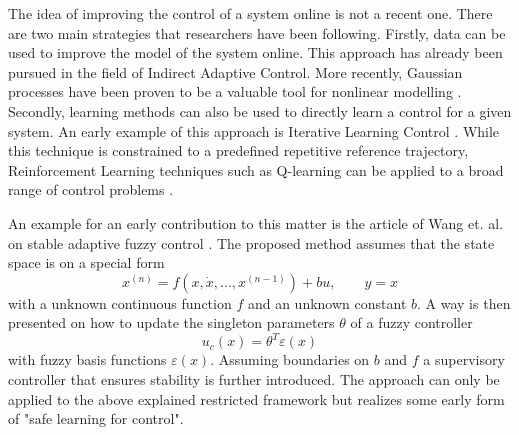 \documentclass[../main.tex]{subfiles}
\begin{document}
The idea of improving the control of a system online is not a recent one. There are two main strategies that researchers have been following. Firstly, data can be used to improve the model of the system online. This approach has already been pursued in the field of Indirect Adaptive Control. More recently, Gaussian processes have been proven to be a valuable tool for nonlinear modelling \cite{murphy2012machine}. Secondly, learning methods can also be used to directly learn a control for a given system. An early example of this approach is Iterative Learning Control \cite{aastrom2013adaptive}. While this technique is constrained to a predefined repetitive reference trajectory, Reinforcement Learning techniques such as Q-learning can be applied to a broad range of control problems \cite{sutton1998reinforcement}.

An example for an early contribution to this matter is the article of Wang et. al. on stable adaptive fuzzy control \cite{wang1993stable}. The proposed method assumes that the state space is on a special form
\begin{equation}
    x^{(n)} = f(x, \dot{x}, ..., x^{(n-1)})+bu, \qquad y=x
\end{equation}
with a unknown continuous function $f$ and an unknown constant $b$. A way is then presented on how to update the singleton parameters $\theta$ of a fuzzy controller
\begin{equation}
    u_c(x) = \theta^T \varepsilon(x)
\end{equation}
with fuzzy basis functions $\varepsilon(x)$. Assuming boundaries on $b$ and $f$ a supervisory controller that ensures stability is further introduced. The approach can only be applied to the above explained restricted framework but realizes some early form of "safe learning for control".
\end{document}
